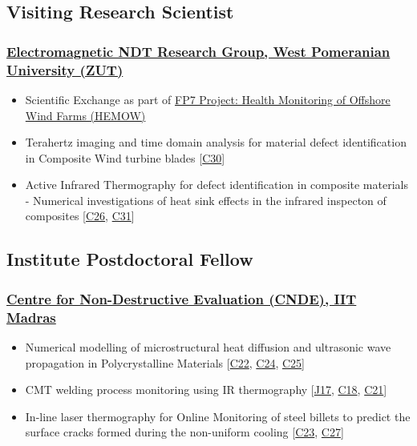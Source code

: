 \documentclass{my_cv}%
\begin{document}
\subsection{Visiting Research Scientist}
\subsubsection{\href{https://innowacje.zut.edu.pl/cooperationoffer/electromagnetic-methods-non-destructive-testing}{Electromagnetic NDT Research Group, West Pomeranian University (ZUT)}}
\begin{itemize}[leftmargin=0.15in]
\setlength\itemsep{-0.1em}
\color{mygray}
\item Scientific Exchange as part of \href{https://cordis.europa.eu/project/id/269202/results}{FP7 Project: Health Monitoring of Offshore Wind Farms (HEMOW)}
\item Terahertz imaging and time domain analysis for material defect identification in Composite Wind turbine blades [\textcolor{mypink}{\hyperref[C30]{C30}}]
\item Active Infrared Thermography for defect identification in composite materials - Numerical investigations of heat sink effects in the infrared inspecton of composites [\textcolor{mypink}{\hyperref[C26]{C26}}, \textcolor{mypink}{\hyperref[C31]{C31}}]
\end{itemize}
{\color{mygray1} \hdashrule[0.1ex]{18.8cm}{0.2mm}{1mm}}
\subsection{Institute Postdoctoral Fellow}
\subsubsection{\href{https://www.cnde.in/}{Centre for Non-Destructive Evaluation (CNDE), IIT Madras}}
\begin{itemize}[leftmargin=0.15in]
\setlength\itemsep{-0.1em}
\color{mygray}
\item Numerical modelling of microstructural heat diffusion and ultrasonic wave propagation in Polycrystalline Materials [\textcolor{mypink}{\hyperref[C22]{C22}}, \textcolor{mypink}{\hyperref[C24]{C24}}, \textcolor{mypink}{\hyperref[C25]{C25}}]
\item CMT welding process monitoring using IR thermography [\textcolor{mypink}{\hyperref[J17]{J17}}, \textcolor{mypink}{\hyperref[C18]{C18}}, \textcolor{mypink}{\hyperref[C21]{C21}}]
\item In-line laser thermography for Online Monitoring of steel billets to predict the surface cracks formed during the non-uniform cooling [\textcolor{mypink}{\hyperref[C23]{C23}}, \textcolor{mypink}{\hyperref[C27]{C27}}]
\end{itemize}
{\color{mygray1} \hdashrule[0.1ex]{18.8cm}{0.2mm}{1mm}}
\end{document}

